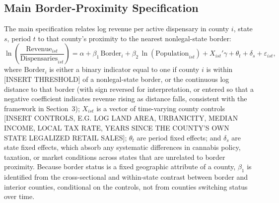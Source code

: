 \documentclass[12pt]{article}
\begin{document}
\subsection{Main Border-Proximity Specification}
The main specification relates log revenue per active dispensary in county $i$, state $s$, period $t$ to
that county's proximity to the nearest nonlegal-state border:
\begin{equation}
\ln\left(\frac{\text{Revenue}_{ist}}{\text{Dispensaries}_{ist}}\right) =
\alpha + \beta_1\, \text{Border}_i + \beta_2\, \ln(\text{Population}_{ist}) + X_{ist}'\gamma +
\theta_t + \delta_s + \varepsilon_{ist},
\end{equation}
where $\text{Border}_i$ is either a binary indicator equal to one if county $i$ is within [INSERT THRESHOLD]
of a nonlegal-state border, or the continuous log distance to that border (with sign reversed for
interpretation, or entered so that a negative coefficient indicates revenue rising as distance falls,
consistent with the framework in Section~3); $X_{ist}$ is a vector of time-varying county controls [INSERT
CONTROLS, E.G. LOG LAND AREA, URBANICITY, MEDIAN INCOME, LOCAL TAX RATE, YEARS SINCE THE COUNTY'S OWN STATE
LEGALIZED RETAIL SALES]; $\theta_t$ are period fixed effects; and $\delta_s$ are state fixed effects, which
absorb any systematic differences in cannabis policy, taxation, or market conditions across states that are
unrelated to border proximity. Because border status is a fixed geographic attribute of a county, $\beta_1$
is identified from the cross-sectional and within-state contrast between border and interior counties,
conditional on the controls, not from counties switching status over time.
\end{document}
